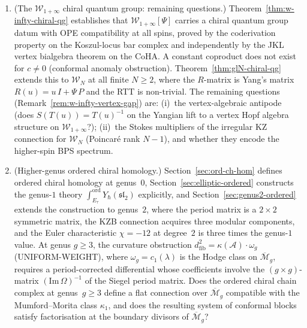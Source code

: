 \documentclass[11pt,reqno]{amsart}
\theoremstyle{definition}
\theoremstyle{remark}
\newcommand{\cA}{\mathcal{A}}
\newcommand{\cM}{\mathcal{M}}
\newcommand{\cW}{\mathcal{W}}
\numberwithin{equation}{section}
\begin{document}
\begin{enumerate}[label=\textup{(\alph*)}]
\item \textup{(The $\cW_{1+\infty}$ chiral quantum group:
remaining questions.)}
Theorem~\ref{thm:w-infty-chiral-qg} establishes that
$\cW_{1+\infty}[\Psi]$ carries a chiral quantum group
datum with OPE compatibility at all spins, proved by
the coderivation property on the Koszul-locus bar complex
and independently by the JKL vertex bialgebra theorem on
the CoHA. A constant coproduct does not exist for
$c \neq 0$ (conformal anomaly obstruction).
Theorem~\ref{thm:glN-chiral-qg} extends this to
$\cW_N$ at all finite $N \geq 2$, where the $R$-matrix
is Yang's matrix $R(u) = u\, I + \Psi\, P$ and the RTT
is non-trivial.
The remaining questions
(Remark~\ref{rem:w-infty-vertex-gap}) are:
(i)~the vertex-algebraic antipode (does
$S(T(u)) = T(u)^{-1}$ on the Yangian lift to a
vertex Hopf algebra structure on $\cW_{1+\infty}$?);
(ii)~the Stokes
multipliers of the irregular KZ connection for $\cW_N$
(Poincar\'e rank $N-1$), and whether they encode the
higher-spin BPS spectrum.

\item \textup{(Higher-genus ordered chiral homology.)}
Section~\ref{sec:ord-ch-hom} defines ordered chiral
homology at genus~$0$,
Section~\ref{sec:elliptic-ordered} constructs the
genus-$1$ theory
$\int_{E_\tau}^{\mathrm{ord}} Y_\hbar(\mathfrak{sl}_2)$
explicitly, and Section~\ref{sec:genus2-ordered} extends the
construction to genus~$2$, where the period matrix is a
$2 \times 2$ symmetric matrix, the KZB connection acquires
three modular components, and the Euler characteristic
$\chi = -12$ at degree~$2$ is three times the genus-$1$
value. At genus $g \geq 3$, the curvature
obstruction $d^2_{\mathrm{fib}} = \kappa(\cA) \cdot \omega_g$
(UNIFORM-WEIGHT), where $\omega_g = c_1(\lambda)$ is
the Hodge class on $\overline{\cM}_g$, requires a
period-corrected differential whose coefficients involve
the $(g \times g)$-matrix $(\mathrm{Im}\, \Omega)^{-1}$
of the Siegel period matrix.
Does the ordered chiral chain complex at genus~$g \geq 3$
define a flat connection over $\overline{\cM}_g$
compatible with the Mumford--Morita class $\kappa_1$,
and does the resulting system of conformal blocks satisfy
factorisation at the boundary divisors of
$\overline{\cM}_g$?


\end{enumerate}
\end{document}
